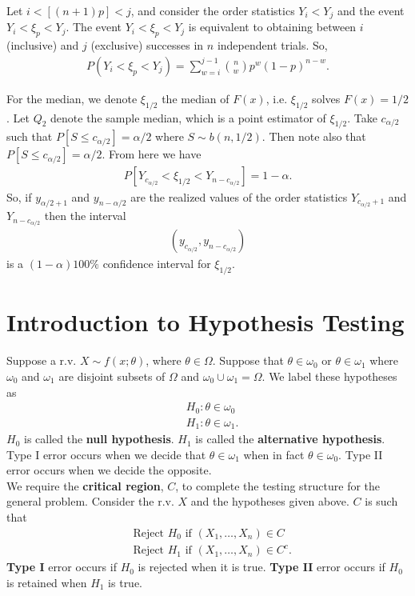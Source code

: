 \documentclass{book}
\theoremstyle{definition}
\newcommand{\nn}{\nonumber}
\newcommand{\lp}{\left(}
\newcommand{\rp}{\right)}
\begin{document}
Let $i < [(n + 1)p] < j$, and consider the order statistics $Y_i < Y_j$ and the event $Y_i < \xi_p < Y_j$. The event $Y_i < \xi_p < Y_j$ is equivalent to obtaining between $i$ (inclusive) and $j$ (exclusive) successes in $n$ independent trials. So,
\begin{align}
P(Y_i < \xi_p < Y_j) = \sum^{j-1}_{w=i} {n\choose{w}}p^w(1-p)^{n-w}.
\end{align}

For the median, we denote $\xi_{1/2}$ the median of $F(x)$, i.e. $\xi_{1/2}$ solves $F(x) = 1/2$. Let $Q_2$ denote the sample median, which is a point estimator of $\xi_{1/2}$. Take $c_{\alpha/2}$ such that $P[S \leq c_{\alpha/2}] = \alpha/2$ where $S \sim b(n,1/2)$. Then note also that $P[S \leq c_{\alpha/2}] = \alpha/2$. From here we have
\begin{align}
P[Y_{c_{\alpha/2}} < \xi_{1/2} < Y_{n-c_{\alpha/2}}] = 1-\alpha.
\end{align}
So, if $y_{\alpha/2 + 1}$ and $y_{n-\alpha/2}$ are the realized values of the order statistics $Y_{c_{\alpha/2} + 1}$ and $Y_{n-c_{\alpha/2}}$ then the interval 
\begin{align}
\boxed{\lp y_{c_{\alpha/2}}, y_{n - c_{\alpha/2}} \rp  }
\end{align}
is a $(1-\alpha)100\%$ confidence interval for $\xi_{1/2}$. 






\section{Introduction to Hypothesis Testing}

Suppose a r.v. $X \sim f(x;\theta)$, where $\theta \in \Omega$. Suppose that $\theta \in \omega_0$ or $\theta \in \omega_1$ where $\omega_0$ and $\omega_1$ are disjoint subsets of $\Omega$ and $\omega_0 \cup \omega_1 = \Omega$. We label these hypotheses as
\begin{align}
&H_0 : \theta \in \omega_0 \nn\\
&H_1 : \theta \in \omega_1.
\end{align}
$H_0$ is called the \textbf{null hypothesis}. $H_1$ is called the \textbf{alternative hypothesis}. Type I error occurs when we decide that $\theta \in \omega_1$ when in fact $\theta \in \omega_0$. Type II error occurs when we decide the opposite. \\

We require the \textbf{critical region}, $C$, to complete the testing structure for the general problem. Consider the r.v. $X$ and the hypotheses given above. $C$ is such that
\begin{align}
&\text{Reject } H_0 \text{ if } (X_1,\dots, X_n) \in C\nn\\
&\text{Reject } H_1 \text{ if } (X_1,\dots, X_n) \in C^c.
\end{align} 
\textbf{Type I} error occurs if $H_0$ is rejected when it is true. \textbf{Type II} error occurs if $H_0$ is retained when $H_1$ is true. \\
\end{document}
